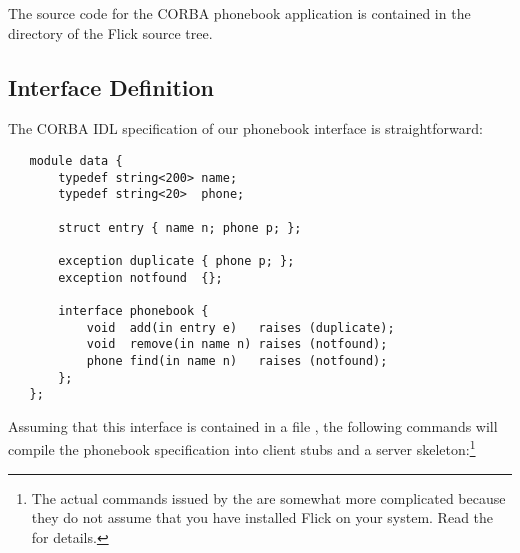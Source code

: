 

The source code for the CORBA phonebook application is contained in the
 directory of the Flick source tree.



\subsection{Interface Definition}
\label{subsec:CORBA:Interface Definition}

The CORBA IDL specification of our phonebook interface is straightforward:

\begin{verbatim}
   module data {
       typedef string<200> name;
       typedef string<20>  phone;

       struct entry { name n; phone p; };

       exception duplicate { phone p; };
       exception notfound  {};

       interface phonebook {
           void  add(in entry e)   raises (duplicate);
           void  remove(in name n) raises (notfound);
           phone find(in name n)   raises (notfound);
       };
   };
\end{verbatim}

Assuming that this interface is contained in a file , the
following commands will compile the phonebook specification into client stubs
and a server skeleton:\footnote{The actual commands issued by the
 are somewhat more complicated because they do not assume
that you have installed Flick on your system.  Read the  for
details.}

